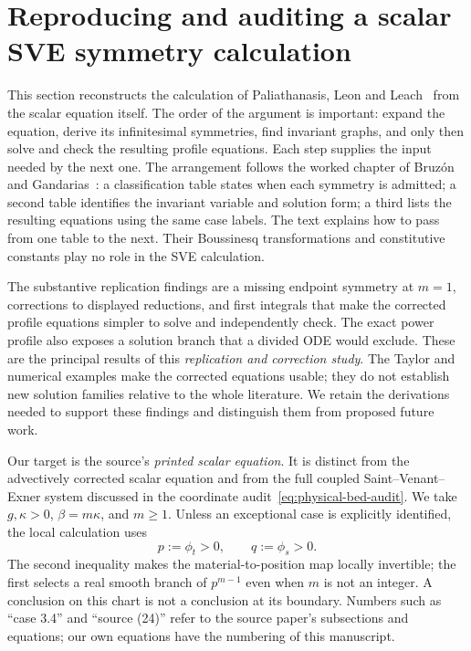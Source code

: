 \section{Reproducing and auditing a scalar SVE symmetry calculation}
\label{sec:sve-repro}
This section reconstructs the calculation of Paliathanasis, Leon and
Leach~\cite{ap} from the scalar equation itself. The order of the argument is
important: expand the equation, derive its infinitesimal symmetries, find
invariant graphs, and only then solve and check the resulting profile
equations. Each step supplies the input needed by the next one. The
arrangement follows the worked chapter of Bruz\'{o}n and
Gandarias~\cite[Sec.~2, Tables~1--3, pp.~157--159]{bruzon-gandarias-2021}:
a classification table states when each symmetry is admitted; a second
table identifies the invariant variable and solution form; a third lists
the resulting equations using the same case labels. The text explains how
to pass from one table to the next. Their Boussinesq transformations and
constitutive constants play no role in the SVE calculation.

The substantive replication findings are a missing endpoint symmetry at
$m=1$, corrections to displayed reductions, and first integrals that make
the corrected profile equations simpler to solve and independently check.
The exact power profile also exposes a solution branch that a divided ODE
would exclude. These are the principal results of this
\emph{replication and correction study}. The Taylor and numerical examples
make the corrected equations usable; they do not establish new solution
families relative to the whole literature. We retain the derivations needed
to support these findings and distinguish them from proposed future work.

Our target is the source's \emph{printed scalar equation}. It is distinct
from the advectively corrected scalar equation and from the full coupled
Saint--Venant--Exner system discussed in the coordinate audit~\eqref{eq:physical-bed-audit}.
We take $g,\kappa>0$, $\beta=m\kappa$, and $m\geq1$. Unless an exceptional
case is explicitly identified, the local calculation uses
\begin{equation}
 p:=\phi_t>0,\qquad q:=\phi_s>0.
 \label{eq:sve-repro-chart}
\end{equation}
The second inequality makes the material-to-position map locally invertible;
the first selects a real smooth branch of $p^{m-1}$ even when $m$ is not an
integer. A conclusion on this chart is not a conclusion at its boundary.
Numbers such as ``case 3.4'' and ``source (24)'' refer to the source paper's
subsections and equations; our own equations have the numbering of this manuscript.

